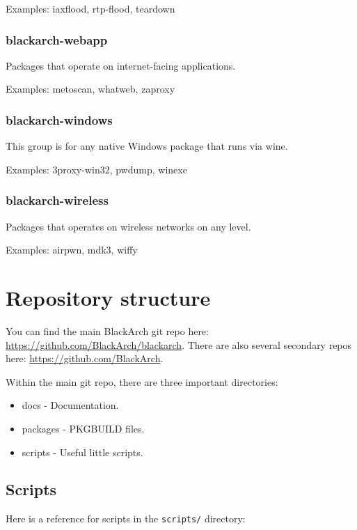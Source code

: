 Examples: iaxflood, rtp-flood, teardown

\subsubsection{blackarch-webapp}
Packages that operate on internet-facing applications.

Examples: metoscan, whatweb, zaproxy

\subsubsection{blackarch-windows}
This group is for any native Windows package that runs via wine.

Examples: 3proxy-win32, pwdump, winexe

\subsubsection{blackarch-wireless}
Packages that operates on wireless networks on any level.

Examples: airpwn, mdk3, wiffy

\section{Repository structure}
You can find the main BlackArch git repo here:
\href{https://github.com/BlackArch/blackarch}{https://github.com/BlackArch/blackarch}.
There are also several secondary repos here:
\href{https://github.com/BlackArch}{https://github.com/BlackArch}.

Within the main git repo, there are three important directories:

\begin{itemize}
\item docs - Documentation.
\item packages - PKGBUILD files.
\item scripts - Useful little scripts.
\end{itemize}

\subsection{Scripts}
Here is a reference for scripts in the \verb|scripts/| directory:

